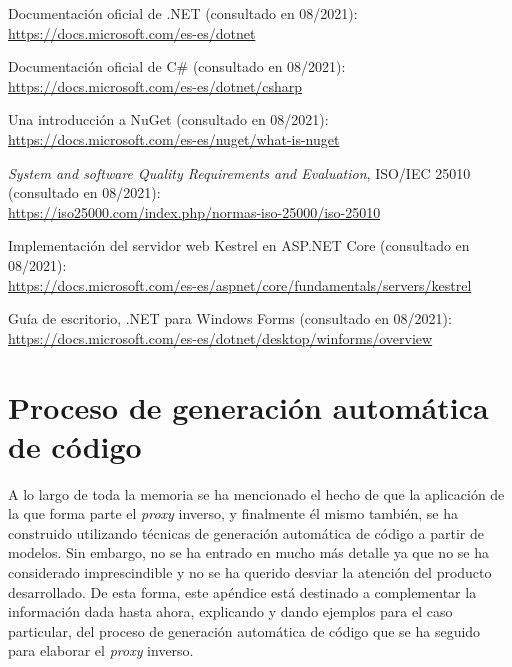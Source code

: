 \documentclass[11pt,spanish,listoffigures]{tfgetsinf}
\begin{document}
\begin{thebibliography}{10}
Documentación oficial de .NET (consultado en 08/2021):\\
\url{https://docs.microsoft.com/es-es/dotnet}

Documentación oficial de C\# (consultado en 08/2021):\\
\url{https://docs.microsoft.com/es-es/dotnet/csharp}

Una introducción a NuGet (consultado en 08/2021):\\
\url{https://docs.microsoft.com/es-es/nuget/what-is-nuget}

\emph{System and software Quality Requirements and Evaluation}, ISO/IEC 25010 (consultado en 08/2021):\\
\url{https://iso25000.com/index.php/normas-iso-25000/iso-25010}

Implementación del servidor web Kestrel en ASP.NET Core (consultado en 08/2021):\\
\url{https://docs.microsoft.com/es-es/aspnet/core/fundamentals/servers/kestrel}

Guía de escritorio, .NET para Windows Forms (consultado en 08/2021):\\
\url{https://docs.microsoft.com/es-es/dotnet/desktop/winforms/overview}

\end{thebibliography}


\APPENDIX

\chapter{Proceso de generación automática de código}

A lo largo de toda la memoria se ha mencionado el hecho de que la aplicación de la que forma parte el \emph{proxy} inverso, y finalmente él mismo también, se ha construido utilizando técnicas de generación automática de código a partir de modelos. Sin embargo, no se ha entrado en mucho más detalle ya que no se ha considerado imprescindible y no se ha querido desviar la atención del producto desarrollado. De esta forma, este apéndice está destinado a complementar la información dada hasta ahora, explicando y dando ejemplos para el caso particular, del proceso de generación automática de código que se ha seguido para elaborar el \emph{proxy} inverso.
\end{document}
